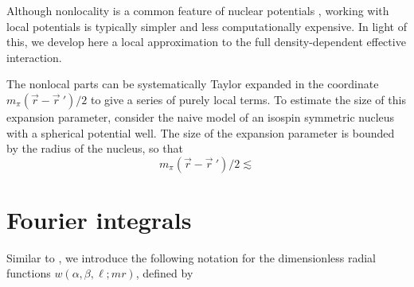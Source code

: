 \documentclass[%
 preprint,
 amsmath,amssymb,
 aps,
]{revtex4-1}
\begin{document}
Although nonlocality is a common feature of nuclear potentials \cite{PhysRevC.53.R1483}, working with local potentials is typically simpler and less computationally expensive. In light of this, we develop here a local approximation to the full density-dependent effective interaction.

The nonlocal parts can be systematically Taylor expanded in the coordinate $m_\pi(\vec{r}-\vec{r}\:')/2$ to give a series of purely local terms. To estimate the size of this expansion parameter, consider the naive model of an isospin symmetric nucleus with a spherical potential well. The size of the expansion parameter is bounded by the radius of the nucleus, so that 
\begin{equation}
m_\pi(\vec{r}-\vec{r}\:')/2 \lesssim 
\end{equation}

\appendix

\section{Fourier integrals}

Similar to \cite{PhysRevC.85.024003}, we introduce the following notation for the dimensionless radial functions $w(\alpha,\beta,\ell; m r)$, defined by
\end{document}
